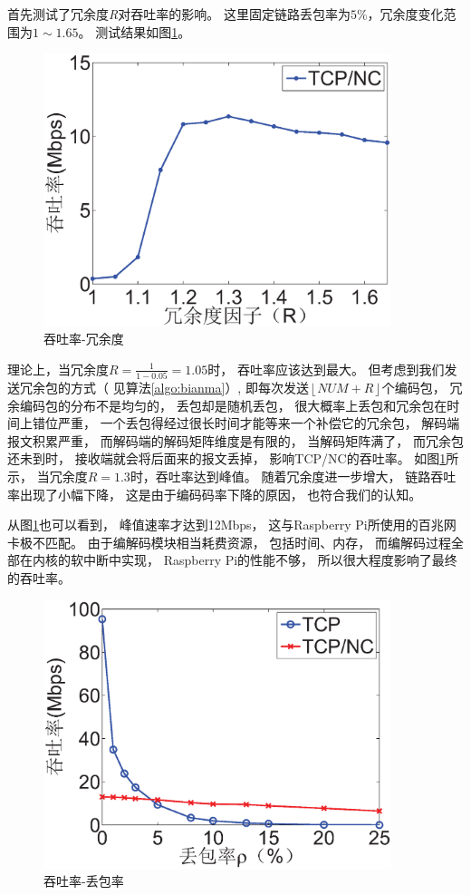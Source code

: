 \par
首先测试了冗余度\emph{R}对吞吐率的影响。
这里固定链路丢包率为$5\%$，冗余度变化范围为$1 \sim 1.65$。
测试结果如图\ref{REDUNDANCY_EPS}。
\begin{figure}[htbp]
	\centering
	\includegraphics[width=4in]{figures/redundancy.eps}
	\caption{吞吐率-冗余度}
	\label{REDUNDANCY_EPS}
\end{figure}
\par
理论上，当冗余度$R=\frac{1}{1-0.05}=1.05$时，
吞吐率应该达到最大。
但考虑到我们发送冗余包的方式（ 见算法\ref{algo:bianma}）,
即每次发送$\left\lfloor NUM+R \right\rfloor$个编码包，
冗余编码包的分布不是均匀的，
丢包却是随机丢包，
很大概率上丢包和冗余包在时间上错位严重，
一个丢包得经过很长时间才能等来一个补偿它的冗余包，
解码端报文积累严重，
而解码端的解码矩阵维度是有限的，
当解码矩阵满了，
而冗余包还未到时，
接收端就会将后面来的报文丢掉，
影响TCP/NC的吞吐率。
如图\ref{REDUNDANCY_EPS}所示，
当冗余度$R=1.3$时，吞吐率达到峰值。
随着冗余度进一步增大，
链路吞吐率出现了小幅下降，
这是由于编码码率下降的原因，
也符合我们的认知。
\par
从图\ref{REDUNDANCY_EPS}也可以看到，
峰值速率才达到12Mbps，
这与Raspberry Pi所使用的百兆网卡极不匹配。
由于编解码模块相当耗费资源，
包括时间、内存，
而编解码过程全部在内核的软中断中实现，
Raspberry Pi的性能不够，
所以很大程度影响了最终的吞吐率。
\par
\begin{figure}[htbp]
	\centering
	\includegraphics[width=4in]{figures/throughput2lossrate.eps}
	\caption{吞吐率-丢包率}
	\label{THROUGHPUT2LOSSRATE_EPS}
\end{figure}
